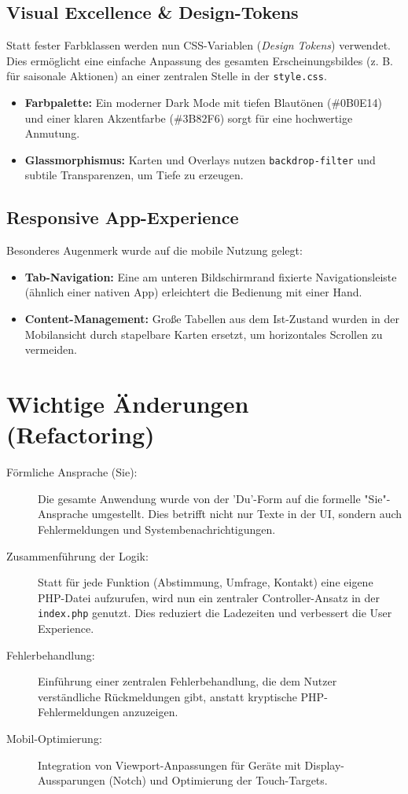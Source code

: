 \documentclass[11pt,
a4paper,
numbers=nonperiod,
footsepline,
oneside,
numbers=noenddot,
bibliography=totoc
]{scrreprt}
\begin{document}
\section{Visual Excellence \& Design-Tokens}
Statt fester Farbklassen werden nun CSS-Variablen (\textit{Design Tokens}) verwendet. Dies ermöglicht eine einfache Anpassung des gesamten Erscheinungsbildes (z. B. für saisonale Aktionen) an einer zentralen Stelle in der \texttt{style.css}.
\begin{itemize}
    \item \textbf{Farbpalette:} Ein moderner Dark Mode mit tiefen Blautönen (\#0B0E14) und einer klaren Akzentfarbe (\#3B82F6) sorgt für eine hochwertige Anmutung.
    \item \textbf{Glassmorphismus:} Karten und Overlays nutzen \texttt{backdrop-filter} und subtile Transparenzen, um Tiefe zu erzeugen.
\end{itemize}

\section{Responsive App-Experience}
Besonderes Augenmerk wurde auf die mobile Nutzung gelegt:
\begin{itemize}
    \item \textbf{Tab-Navigation:} Eine am unteren Bildschirmrand fixierte Navigationsleiste (ähnlich einer nativen App) erleichtert die Bedienung mit einer Hand.
    \item \textbf{Content-Management:} Große Tabellen aus dem Ist-Zustand wurden in der Mobilansicht durch stapelbare Karten ersetzt, um horizontales Scrollen zu vermeiden.
\end{itemize}

\chapter{Wichtige Änderungen (Refactoring)}
\begin{description}
    \item[Förmliche Ansprache (Sie):] Die gesamte Anwendung wurde von der 'Du'-Form auf die formelle "Sie"-Ansprache umgestellt. Dies betrifft nicht nur Texte in der UI, sondern auch Fehlermeldungen und Systembenachrichtigungen.
    \item[Zusammenführung der Logik:] Statt für jede Funktion (Abstimmung, Umfrage, Kontakt) eine eigene PHP-Datei aufzurufen, wird nun ein zentraler Controller-Ansatz in der \texttt{index.php} genutzt. Dies reduziert die Ladezeiten und verbessert die User Experience.
    \item[Fehlerbehandlung:] Einführung einer zentralen Fehlerbehandlung, die dem Nutzer verständliche Rückmeldungen gibt, anstatt kryptische PHP-Fehlermeldungen anzuzeigen.
    \item[Mobil-Optimierung:] Integration von Viewport-Anpassungen für Geräte mit Display-Aussparungen (Notch) und Optimierung der Touch-Targets.
\end{description}
\end{document}
